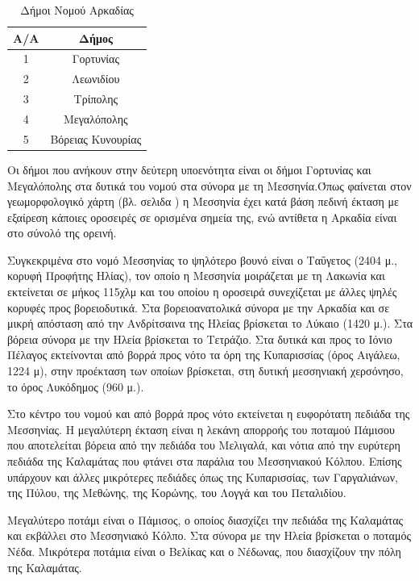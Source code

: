 \documentclass[12pt]{article}
\begin{document}
	\begin{table} [H]
		\centering
		\begin{tabular}{|c|c|}
			\hline
			\textbf{Α/Α} & \textbf{Δήμος} \\ \hline
			1 & Γορτυνίας \\ \hline
			2 & Λεωνιδίου \\ \hline
			3 & Τρίπολης \\ \hline
			4 & Μεγαλόπολης \\ \hline
			5 & Βόρειας Κυνουρίας \\ \hline
		\end{tabular}
		\caption{Δήμοι Νομού Αρκαδίας}
		\label{The label}
	\end{table}
	
	Οι δήμοι που ανήκουν στην δεύτερη υποενότητα είναι οι δήμοι Γορτυνίας και Μεγαλόπολης στα δυτικά του νομού στα σύνορα με τη Μεσσηνία.Όπως φαίνεται στον γεωμορφολογικό χάρτη (βλ. σελιδα \pageref{peloponnese}) η Μεσσηνία έχει κατά βάση πεδινή έκταση με εξαίρεση κάποιες οροσειρές σε ορισμένα σημεία της, ενώ αντίθετα η Αρκαδία είναι στο σύνολό της ορεινή.
	
	Συγκεκριμένα στο νομό Μεσσηνίας το ψηλότερο βουνό είναι ο Ταΰγετος (2404 μ., κορυφή Προφήτης Ηλίας), τον οποίο η Μεσσηνία μοιράζεται με τη Λακωνία και εκτείνεται σε μήκος 115χλμ και του οποίου η οροσειρά συνεχίζεται με άλλες ψηλές κορυφές προς βορειοδυτικά. Στα βορειοανατολικά σύνορα με την Αρκαδία και σε μικρή απόσταση από την Ανδρίτσαινα της Ηλείας βρίσκεται το Λύκαιο (1420 μ.). Στα βόρεια σύνορα με την Ηλεία βρίσκεται το Τετράζιο. Στα δυτικά και προς το Ιόνιο Πέλαγος εκτείνονται από βορρά προς νότο τα όρη της Κυπαρισσίας (όρος Αιγάλεω, 1224 μ), στην προέκταση των οποίων βρίσκεται, στη δυτική μεσσηνιακή χερσόνησο, το όρος Λυκόδημος (960 μ.). 
	
	Στο κέντρο του νομού και από βορρά προς νότο εκτείνεται η ευφορότατη πεδιάδα της Μεσσηνίας. Η μεγαλύτερη έκταση είναι η λεκάνη απορροής του ποταμού Πάμισου που αποτελείται βόρεια από την πεδιάδα του Μελιγαλά, και νότια από την ευρύτερη πεδιάδα της Καλαμάτας που φτάνει στα παράλια του Μεσσηνιακού Κόλπου. Επίσης υπάρχουν και άλλες μικρότερες πεδιάδες όπως της Κυπαρισσίας, των Γαργαλιάνων, της Πύλου, της Μεθώνης, της Κορώνης, του Λογγά και του Πεταλιδίου.
	
	Μεγαλύτερο ποτάμι είναι ο Πάμισος, ο οποίος διασχίζει την πεδιάδα της Καλαμάτας και εκβάλλει στο Μεσσηνιακό Κόλπο. Στα σύνορα με την Ηλεία βρίσκεται ο ποταμός Νέδα. Μικρότερα ποτάμια είναι ο Βελίκας και ο Νέδωνας, που διασχίζουν την πόλη της Καλαμάτας. 
	
\end{document}
